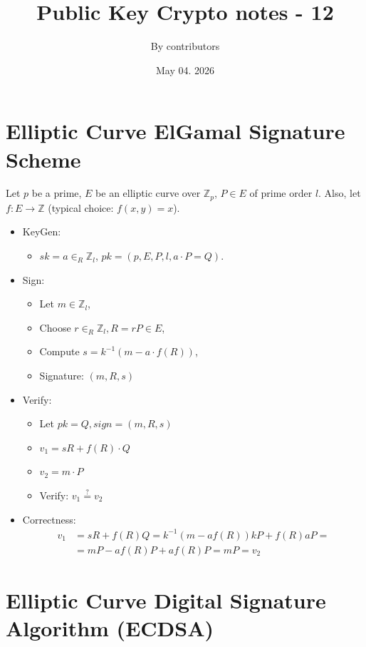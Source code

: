 \documentclass[11pt]{article}
\theoremstyle{definition}
\theoremstyle{proof}
\begin{document}
\title{Public Key Crypto notes - 12}
\author{By contributors}
\date{May 04. 2026}
\maketitle

\section{Elliptic Curve ElGamal Signature Scheme}

Let $p$ be a prime, $E$ be an elliptic curve over $\mathbb{Z}_p$, $P \in E$ of prime order $l$. Also, let $f: E \rightarrow \mathbb{Z}$ (typical choice: $f(x, y) = x$).

\begin{itemize}
	\item KeyGen:
	\begin{itemize}
		\item $sk = a \in_R \mathbb{Z}_l$, $pk = (p, E, P, l, a \cdot P = Q)$.
	\end{itemize}
	\item Sign:
	\begin{itemize}
		\item Let $m \in \mathbb{Z}_l$,
		\item Choose $r \in_R \mathbb{Z}_l, R = rP \in E$,
		\item Compute $s = k^{-1}(m - a \cdot f(R))$,
		\item Signature: $(m, R, s)$
	\end{itemize}
	\item Verify:
	\begin{itemize}
		\item Let $pk = Q, sign = (m, R, s)$
		\item $v_1 = sR + f(R) \cdot Q$
		\item $v_2 = m \cdot P$
		\item Verify: $v_1 \stackrel{?}{=} v_2$
	\end{itemize}
	\item Correctness:
	\begin{align}
		v_1 &= sR + f(R)Q = k^{-1}(m-af(R)) kP + f(R)aP =\\
		&= mP-af(R)P+af(R)P = mP = v_2
	\end{align}
\end{itemize}

\section{Elliptic Curve Digital Signature Algorithm (ECDSA)}
\end{document}
